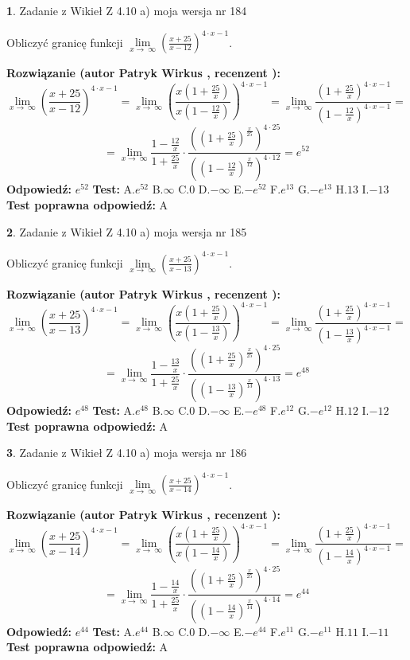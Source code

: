 \documentclass[12pt, a4paper]{article}
\theoremstyle{definition} %
\newtheorem{zad}{}
\newcommand{\zadStart}[1]{\begin{zad}#1\newline}
\newcommand{\zadStop}{\end{zad}}
\newcommand{\rozwStart}[2]{\noindent \textbf{Rozwiązanie (autor #1 , recenzent #2): }\newline}
\newcommand{\rozwStop}{\newline}
\newcommand{\odpStart}{\noindent \textbf{Odpowiedź:}\newline}
\newcommand{\odpStop}{\newline}
\newcommand{\testStart}{\noindent \textbf{Test:}\newline}
\newcommand{\testStop}{\newline}
\newcommand{\kluczStart}{\noindent \textbf{Test poprawna odpowiedź:}\newline}
\newcommand{\kluczStop}{\newline}
\begin{document}
\zadStart{Zadanie z Wikieł Z 4.10 a) moja wersja nr 184}

Obliczyć granicę funkcji  $\lim\limits_{x\to\ \infty}(\frac{x+25}{x-12})^{4\cdot x-1}$.
\zadStop
\rozwStart{Patryk Wirkus}{}
$$\lim\limits_{x\to\ \infty}(\frac{x+25}{x-12})^{4\cdot x-1} = \lim\limits_{x\to\ \infty}(\frac{x(1+\frac{25}{x})}{x(1-\frac{12}{x})})^{4\cdot x-1}=\lim\limits_{x\to\ \infty}\frac{(1+\frac{25}{x})^{4\cdot x-1}}{(1-\frac{12}{x})^{4\cdot x-1}}=$$
$$=\lim\limits_{x\to\ \infty}\frac{1-\frac{12}{x}}{1+\frac{25}{x}}\cdot\frac{((1+\frac{25}{x})^{\frac{x}{25}})^{4\cdot25}}{((1-\frac{12}{x})^{\frac{x}{12}})^{4\cdot12}}=e^{52}$$
\rozwStop
\odpStart
$e^{52}$
\odpStop
\testStart
A.$e^{52}$ B.$\infty$ C.$0$ D.$-\infty$ E.$-e^{52}$
F.$e^{13}$ G.$-e^{13}$
H.$13$
I.$-13$
\testStop
\kluczStart
A
\kluczStop



\zadStart{Zadanie z Wikieł Z 4.10 a) moja wersja nr 185}

Obliczyć granicę funkcji  $\lim\limits_{x\to\ \infty}(\frac{x+25}{x-13})^{4\cdot x-1}$.
\zadStop
\rozwStart{Patryk Wirkus}{}
$$\lim\limits_{x\to\ \infty}(\frac{x+25}{x-13})^{4\cdot x-1} = \lim\limits_{x\to\ \infty}(\frac{x(1+\frac{25}{x})}{x(1-\frac{13}{x})})^{4\cdot x-1}=\lim\limits_{x\to\ \infty}\frac{(1+\frac{25}{x})^{4\cdot x-1}}{(1-\frac{13}{x})^{4\cdot x-1}}=$$
$$=\lim\limits_{x\to\ \infty}\frac{1-\frac{13}{x}}{1+\frac{25}{x}}\cdot\frac{((1+\frac{25}{x})^{\frac{x}{25}})^{4\cdot25}}{((1-\frac{13}{x})^{\frac{x}{13}})^{4\cdot13}}=e^{48}$$
\rozwStop
\odpStart
$e^{48}$
\odpStop
\testStart
A.$e^{48}$ B.$\infty$ C.$0$ D.$-\infty$ E.$-e^{48}$
F.$e^{12}$ G.$-e^{12}$
H.$12$
I.$-12$
\testStop
\kluczStart
A
\kluczStop



\zadStart{Zadanie z Wikieł Z 4.10 a) moja wersja nr 186}

Obliczyć granicę funkcji  $\lim\limits_{x\to\ \infty}(\frac{x+25}{x-14})^{4\cdot x-1}$.
\zadStop
\rozwStart{Patryk Wirkus}{}
$$\lim\limits_{x\to\ \infty}(\frac{x+25}{x-14})^{4\cdot x-1} = \lim\limits_{x\to\ \infty}(\frac{x(1+\frac{25}{x})}{x(1-\frac{14}{x})})^{4\cdot x-1}=\lim\limits_{x\to\ \infty}\frac{(1+\frac{25}{x})^{4\cdot x-1}}{(1-\frac{14}{x})^{4\cdot x-1}}=$$
$$=\lim\limits_{x\to\ \infty}\frac{1-\frac{14}{x}}{1+\frac{25}{x}}\cdot\frac{((1+\frac{25}{x})^{\frac{x}{25}})^{4\cdot25}}{((1-\frac{14}{x})^{\frac{x}{14}})^{4\cdot14}}=e^{44}$$
\rozwStop
\odpStart
$e^{44}$
\odpStop
\testStart
A.$e^{44}$ B.$\infty$ C.$0$ D.$-\infty$ E.$-e^{44}$
F.$e^{11}$ G.$-e^{11}$
H.$11$
I.$-11$
\testStop
\kluczStart
A
\kluczStop
\end{document}
